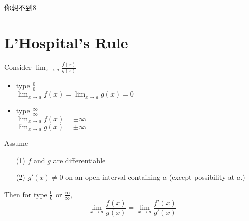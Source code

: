 \begin{jk}
你想不到8
\end{jk}

\section{L'Hospital's Rule}
\begin{theorem}
Consider $\displaystyle \lim_{x\to a} \frac{f(x)}{g(x)}$
\begin{itemize}
\item type $\displaystyle \frac{0}{0}$\\
$\displaystyle \lim_{x\to a} f(x) = \lim_{x \to a} g(x) = 0$
\item type $\displaystyle \frac{\infty}{\infty}$\\
$\displaystyle \lim_{x\to a} f(x) = \pm \infty$\\
$\displaystyle \lim_{x\to a} g(x) = \pm \infty$
\end{itemize}
Assume 
\begin{itemize}
\item[(1)] $f$ and $g$ are differentiable
\item[(2)] $g'(x) \neq 0$ on an open interval containing $a$ (except possibility at $a$.)
\end{itemize}
Then for type $\displaystyle \frac{0}{0}$ or $\displaystyle \frac{\infty}{\infty}$, 
$$\displaystyle \lim_{x\to a} \frac{f(x)}{g(x)} = \lim_{x \to a} \frac{f'(x)}{g'(x)}$$
\end{theorem}

